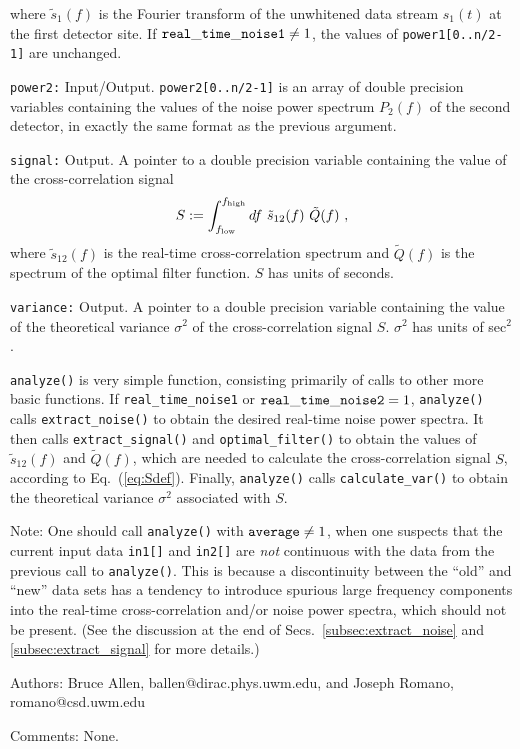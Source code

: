 \begin{description}
%
where $\tilde s_1(f)$ is the Fourier transform of the unwhitened
data stream $s_1(t)$ at the first detector site.
If ${\tt real\_time\_noise1}\ne 1$, the values of {\tt power1[0..n/2-1]} 
are unchanged.
%
\item{\tt power2:} Input/Output.  
{\tt power2[0..n/2-1]} is an array of double precision variables 
containing the values of the noise power spectrum $P_2(f)$ of the 
second detector, in exactly the same format as the previous
argument.
%
\item{\tt signal:} Output.
A pointer to a double precision variable containing the value of the 
cross-correlation signal
%
\begin{equation}
S:=\int_{f_{\rm low}}^{f_{\rm high}} df\ \tilde s_{12}(f)\ \tilde Q(f)\ ,
\label{eq:Sdef}
\end{equation}
%
where $\tilde s_{12}(f)$ is the real-time cross-correlation spectrum
and $\tilde Q(f)$ is the spectrum of the optimal filter function.
$S$ has units of seconds.
%
\item{\tt variance:} Output.
A pointer to a double precision variable containing the value of the 
theoretical variance $\sigma^2$ of the cross-correlation signal $S$.
$\sigma^2$ has units of sec${}^2$.
\end{description}

{\tt analyze()} is very simple function, consisting primarily of 
calls to other more basic functions.
If {\tt real\_time\_noise1} or ${\tt real\_time\_noise2}=1$,
{\tt analyze()} calls {\tt extract\_noise()} to obtain the desired 
real-time noise power spectra.
It then calls {\tt extract\_signal()} and {\tt optimal\_filter()}
to obtain the values of $\tilde s_{12}(f)$ and $\tilde Q(f)$, which
are needed to calculate the cross-correlation signal $S$, according 
to Eq.~(\ref{eq:Sdef}).
Finally, {\tt analyze()} calls {\tt calculate\_var()} to obtain the 
theoretical variance $\sigma^2$ associated with $S$.

Note: One should call {\tt analyze()} with ${\tt average}\ne 1$,
when one suspects that the current input data {\tt in1[]} and {\tt in2[]} 
are {\it not} continuous with the data from the previous call to 
{\tt analyze()}.
This is because a discontinuity between the ``old'' and ``new'' data
sets has a tendency to introduce spurious large frequency components 
into the real-time cross-correlation and/or noise power spectra, which
should not be present.
(See the discussion at the end of Secs.~\ref{subsec:extract_noise}
and \ref{subsec:extract_signal} for more details.)
%
\begin{description}
\item{Authors:}
Bruce Allen, ballen@dirac.phys.uwm.edu, and Joseph Romano, romano@csd.uwm.edu
\item{Comments:}
None.
\end{description}
\clearpage

